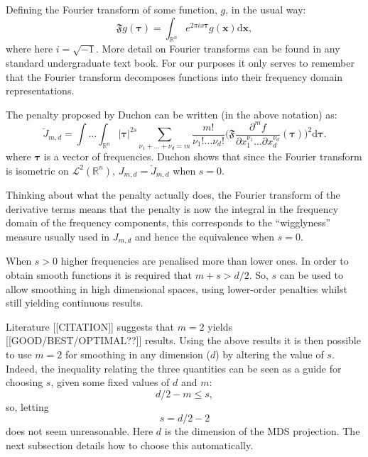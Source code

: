 {Defining the Fourier transform of some function, $g$, in the usual way:
\begin{equation}
\mathfrak{F} g(\mathbf{\tau}) = \int_{\mathbb{R}^n} e^{2 \pi i x \mathbf{\tau}} g(\mathbf{x}) \text{d}\mathbf{x},
\end{equation}
where here $i=\sqrt{-1}$. More detail on Fourier transforms can be found in any standard undergraduate text book. For our purposes it only serves to remember that the Fourier transform decomposes functions into their frequency domain representations.

The penalty proposed by Duchon can be written (in the above notation) as:
\begin{equation}
\breve{J}_{m,d} = \int \ldots \int_{\mathbb{R}^n} \lvert \mathbf{\tau} \rvert^{2s} \sum_{\nu_1 + \dots + \nu_d=m} \frac{m!}{\nu_1! \dots \nu_d!}\Big( \mathfrak{F} \frac{\partial^m f}{\partial x_1^{\nu_1} \ldots  \partial x_d^{\nu_d}}(\mathbf{\tau}) \Big)^2 \text{d} \mathbf{\tau}.
\end{equation}
where $\mathbf{\tau}$ is a vector of frequencies. Duchon shows that since the Fourier transform is isometric on $\mathcal{L}^2(\mathbb{R}^n)$, $J_{m,d} = \breve{J}_{m,d}$ when $s=0$.

Thinking about what the penalty actually does, the Fourier transform of the derivative terms means that the penalty is now the integral in the frequency domain of the frequency components, this corresponds to the ``wigglyness'' measure usually used in $J_{m,d}$ and hence the equivalence when $s=0$.

When $s>0$ higher frequencies are penalised more than lower ones. In order to obtain smooth functions it is required that $m+s>d/2$. So, $s$ can be used to allow smoothing in high dimensional spaces, using lower-order penalties whilst still yielding continuous results.

Literature [[CITATION]] suggests that $m=2$ yields [[GOOD/BEST/OPTIMAL??]] results. Using the above results it is then possible to use $m=2$ for smoothing in any dimension ($d$) by altering the value of $s$. Indeed, the inequality relating the three quantities can be seen as a guide for choosing $s$, given some fixed values of $d$ and $m$:
\begin{equation}
d/2 -m \leq s,
\end{equation}
so, letting
\begin{equation}
s=d/2-2
\end{equation}
does not seem unreasonable. Here $d$ is the dimension of the MDS projection. The next subsection details how to choose this automatically.

}
